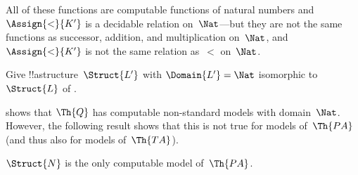 \documentclass[../../../include/open-logic-section]{subfiles}
\begin{document}
\begin{ex}
All of these functions are computable functions of natural numbers and
$\Assign{<}{K'}$ is a decidable relation on~$\Nat$---but they are not
the same functions as successor, addition, and multiplication
on~$\Nat$, and $\Assign{<}{K'}$ is not the same relation as~$<$
on~$\Nat$.
\end{ex}

\begin{prob}
Give !!a{structure}~$\Struct{L'}$ with $\Domain{L'} = \Nat$ isomorphic
to~$\Struct{L}$ of .
\end{prob}

\begin{explain}
 shows that $\Th{Q}$ has computable
non-standard models with domain~$\Nat$.  However, the following result
shows that this is not true for models of~$\Th{PA}$ (and thus also for
models of~$\Th{TA}$).
\end{explain}

\begin{thm}
$\Struct{N}$ is the only computable model of~$\Th{PA}$.
\end{thm}
  
\end{document}
